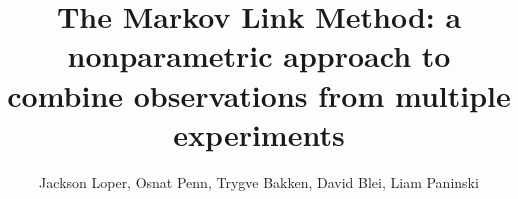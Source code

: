 



\DeclareMathOperator*{\tr}{tr}

\newcommand{\UN}[1]{\ensuremath{\left|#1\right|_\infty}}
\newcommand{\TV}[1]{\ensuremath{\left\Vert #1\right\Vert_{TV}}}
\newcommand{\EN}[1]{\ensuremath{\left|#1\right|}}
\newcommand{\kldiv}[2]{\ensuremath{D\left(#1||#2\right)}}


\newcommand{\figgygr}[2]{pic}
\newcommand{\figgygrs}[3]{\begin{tabular}{c}pic\\#3\end{tabular}}
\newcommand{\figgygrsTable}[3]{\begin{tabular}{c}{#2}\\#3\end{tabular}}
\newcommand{\figgygrsH}[3]{\begin{tabular}{c}pic\\#3\end{tabular}}



\newcommand{\figgy}[1]{\begin{figure}\fbox{\begin{minipage}{\textwidth}#1\end{minipage}}\end{figure}}

\usepackage{cancel}


\title{The Markov Link Method: a nonparametric approach to combine observations from multiple experiments}
\author{Jackson Loper, Osnat Penn, Trygve Bakken, David Blei, Liam Paninski}


